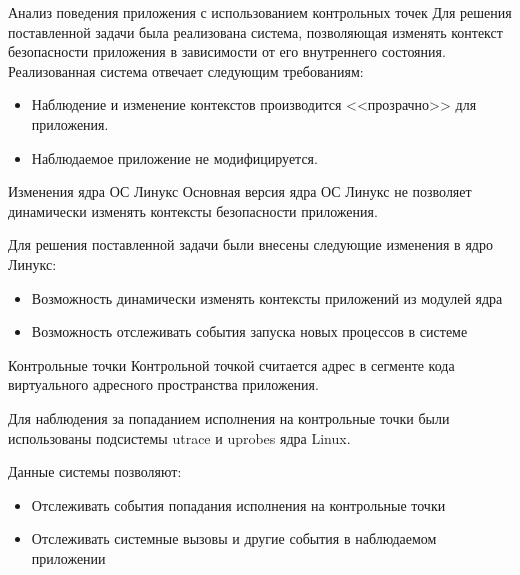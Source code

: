 \documentclass{beamer}
\begin{document}
\begin{frame}{Анализ поведения приложения с использованием контрольных точек}
Для решения поставленной задачи была реализована система,
позволяющая изменять контекст безопасности приложения в зависимости
от его внутреннего состояния.
Реализованная система отвечает следующим требованиям:
\begin{itemize}
\item Наблюдение и изменение контекстов производится
        <<прозрачно>> для приложения.
\item Наблюдаемое приложение не модифицируется.
\end{itemize}

\end{frame}
\begin{frame}{Изменения ядра ОС Линукс}
Основная версия ядра ОС Линукс не позволяет динамически
изменять контексты безопасности приложения.

Для решения поставленной задачи были внесены следующие
изменения в ядро Линукс:

\begin{itemize}
\item Возможность динамически изменять контексты приложений
        из модулей ядра
\item Возможность отслеживать события запуска новых процессов
        в системе
\end{itemize}
\end{frame}
 


 

\begin{frame}[fragile]{Контрольные точки}
Контрольной точкой считается адрес в сегменте кода
виртуального адресного пространства приложения.

Для наблюдения за попаданием исполнения на контрольные
точки были использованы подсистемы utrace и uprobes
ядра Linux.

Данные системы позволяют:
\begin{itemize}
\item Отслеживать события попадания исполнения на контрольные точки
\item Отслеживать системные вызовы и другие события в наблюдаемом приложении
\end{itemize}

\end{frame}
\end{document}
